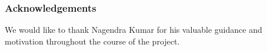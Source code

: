 \documentclass[9pt, compress]{beamer}
\begin{document}
\begin{frame}[fragile]
	\frametitle{Acknowledgements}
We would like to thank Nagendra Kumar for his valuable guidance and motivation throughout the course of the project.
\end{frame}

\end{document}
